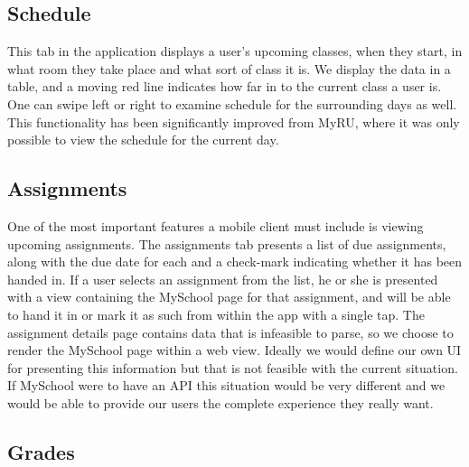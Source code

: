 \documentclass[pdftex, DIV=calc, paper=a4, fontsize=11pt]{scrartcl}	 %
\begin{document}
\subsection{Schedule}

This tab in the application displays a user's upcoming classes, when they start, in what room they
take place and what sort of class it is. We display the data in a table, and a moving red line indicates
how far in to the current class a user is. One can swipe left or right to examine schedule for
the surrounding days as well. This functionality has been significantly improved from MyRU,
where it was only possible to view the schedule for the current day.

\subsection{Assignments}

One of the most important features a mobile client must include is viewing upcoming assignments.
The assignments tab presents a list of due assignments, along with the due date for each and a check-mark
indicating whether it has been handed in. If a user selects an assignment from the list, he or she
is presented with a view containing the MySchool page for that assignment, and will be able to hand
it in or mark it as such from within the app with a single tap. The assignment details page contains
data that is infeasible to parse, so we choose to render the MySchool page within a web view. Ideally
we would define our own UI for presenting this information but that is not feasible with the current
situation. If MySchool were to have an API this situation would be very different and we would be
able to provide our users the complete experience they really want.

\subsection{Grades}
\end{document}
